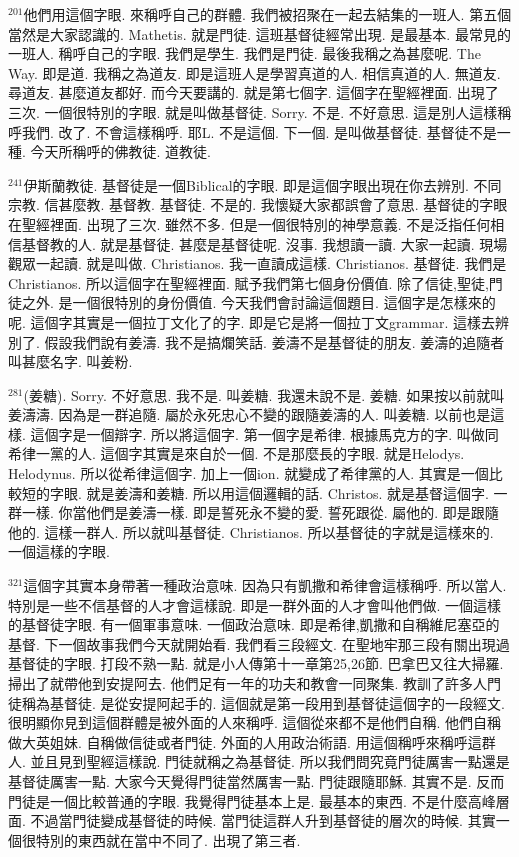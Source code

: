 \documentclass{book}
\begin{document}
$^{201}$他們用這個字眼.
來稱呼自己的群體.
我們被招聚在一起去結集的一班人.
第五個當然是大家認識的.
Mathetis.
就是門徒.
這班基督徒經常出現.
是最基本.
最常見的一班人.
稱呼自己的字眼.
我們是學生.
我們是門徒.
最後我稱之為甚麼呢.
The Way.
即是道.
我稱之為道友.
即是這班人是學習真道的人.
相信真道的人.
無道友.
尋道友.
甚麼道友都好.
而今天要講的.
就是第七個字.
這個字在聖經裡面.
出現了三次.
一個很特別的字眼.
就是叫做基督徒.
Sorry.
不是.
不好意思.
這是別人這樣稱呼我們.
改了.
不會這樣稱呼.
耶L.
不是這個.
下一個.
是叫做基督徒.
基督徒不是一種.
今天所稱呼的佛教徒.
道教徒.

$^{241}$伊斯蘭教徒.
基督徒是一個Biblical的字眼.
即是這個字眼出現在你去辨別.
不同宗教.
信甚麼教.
基督教.
基督徒.
不是的.
我懷疑大家都誤會了意思.
基督徒的字眼在聖經裡面.
出現了三次.
雖然不多.
但是一個很特別的神學意義.
不是泛指任何相信基督教的人.
就是基督徒.
甚麼是基督徒呢.
沒事.
我想讀一讀.
大家一起讀.
現場觀眾一起讀.
就是叫做.
Christianos.
我一直讀成這樣.
Christianos.
基督徒.
我們是Christianos.
所以這個字在聖經裡面.
賦予我們第七個身份價值.
除了信徒,聖徒,門徒之外.
是一個很特別的身份價值.
今天我們會討論這個題目.
這個字是怎樣來的呢.
這個字其實是一個拉丁文化了的字.
即是它是將一個拉丁文grammar.
這樣去辨別了.
假設我們說有姜濤.
我不是搞爛笑話.
姜濤不是基督徒的朋友.
姜濤的追隨者叫甚麼名字.
叫姜粉.

$^{281}$(姜糖).
Sorry.
不好意思.
我不是.
叫姜糖.
我還未說不是.
姜糖.
如果按以前就叫姜濤濤.
因為是一群追隨.
屬於永死忠心不變的跟隨姜濤的人.
叫姜糖.
以前也是這樣.
這個字是一個辯字.
所以將這個字.
第一個字是希律.
根據馬克方的字.
叫做同希律一黨的人.
這個字其實是來自於一個.
不是那麼長的字眼.
就是Helodys.
Helodynus.
所以從希律這個字.
加上一個ion.
就變成了希律黨的人.
其實是一個比較短的字眼.
就是姜濤和姜糖.
所以用這個邏輯的話.
Christos.
就是基督這個字.
一群一樣.
你當他們是姜濤一樣.
即是誓死永不變的愛.
誓死跟從.
屬他的.
即是跟隨他的.
這樣一群人.
所以就叫基督徒.
Christianos.
所以基督徒的字就是這樣來的.
一個這樣的字眼.

$^{321}$這個字其實本身帶著一種政治意味.
因為只有凱撒和希律會這樣稱呼.
所以當人.
特別是一些不信基督的人才會這樣說.
即是一群外面的人才會叫他們做.
一個這樣的基督徒字眼.
有一個軍事意味.
一個政治意味.
即是希律,凱撒和自稱維尼塞亞的基督.
下一個故事我們今天就開始看.
我們看三段經文.
在聖地牢那三段有關出現過基督徒的字眼.
打段不熟一點.
就是小人傳第十一章第25,26節.
巴拿巴又往大掃羅.
掃出了就帶他到安提阿去.
他們足有一年的功夫和教會一同聚集.
教訓了許多人門徒稱為基督徒.
是從安提阿起手的.
這個就是第一段用到基督徒這個字的一段經文.
很明顯你見到這個群體是被外面的人來稱呼.
這個從來都不是他們自稱.
他們自稱做大英姐妹.
自稱做信徒或者門徒.
外面的人用政治術語.
用這個稱呼來稱呼這群人.
並且見到聖經這樣說.
門徒就稱之為基督徒.
所以我們問究竟門徒厲害一點還是基督徒厲害一點.
大家今天覺得門徒當然厲害一點.
門徒跟隨耶穌.
其實不是.
反而門徒是一個比較普通的字眼.
我覺得門徒基本上是.
最基本的東西.
不是什麼高峰層面.
不過當門徒變成基督徒的時候.
當門徒這群人升到基督徒的層次的時候.
其實一個很特別的東西就在當中不同了.
出現了第三者.
\end{document}
